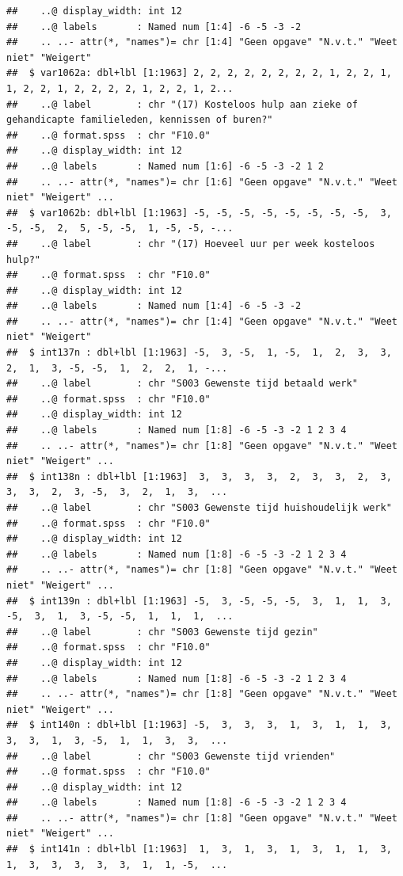 \documentclass[
]{book}
\begin{document}
\begin{verbatim}
##    ..@ display_width: int 12
##    ..@ labels       : Named num [1:4] -6 -5 -3 -2
##    .. ..- attr(*, "names")= chr [1:4] "Geen opgave" "N.v.t." "Weet niet" "Weigert"
##  $ var1062a: dbl+lbl [1:1963] 2, 2, 2, 2, 2, 2, 2, 2, 1, 2, 2, 1, 1, 2, 2, 1, 2, 2, 2, 2, 1, 2, 2, 1, 2...
##    ..@ label        : chr "(17) Kosteloos hulp aan zieke of gehandicapte familieleden, kennissen of buren?"
##    ..@ format.spss  : chr "F10.0"
##    ..@ display_width: int 12
##    ..@ labels       : Named num [1:6] -6 -5 -3 -2 1 2
##    .. ..- attr(*, "names")= chr [1:6] "Geen opgave" "N.v.t." "Weet niet" "Weigert" ...
##  $ var1062b: dbl+lbl [1:1963] -5, -5, -5, -5, -5, -5, -5, -5,  3, -5, -5,  2,  5, -5, -5,  1, -5, -5, -...
##    ..@ label        : chr "(17) Hoeveel uur per week kosteloos hulp?"
##    ..@ format.spss  : chr "F10.0"
##    ..@ display_width: int 12
##    ..@ labels       : Named num [1:4] -6 -5 -3 -2
##    .. ..- attr(*, "names")= chr [1:4] "Geen opgave" "N.v.t." "Weet niet" "Weigert"
##  $ int137n : dbl+lbl [1:1963] -5,  3, -5,  1, -5,  1,  2,  3,  3,  2,  1,  3, -5, -5,  1,  2,  2,  1, -...
##    ..@ label        : chr "S003 Gewenste tijd betaald werk"
##    ..@ format.spss  : chr "F10.0"
##    ..@ display_width: int 12
##    ..@ labels       : Named num [1:8] -6 -5 -3 -2 1 2 3 4
##    .. ..- attr(*, "names")= chr [1:8] "Geen opgave" "N.v.t." "Weet niet" "Weigert" ...
##  $ int138n : dbl+lbl [1:1963]  3,  3,  3,  3,  2,  3,  3,  2,  3,  3,  3,  2,  3, -5,  3,  2,  1,  3,  ...
##    ..@ label        : chr "S003 Gewenste tijd huishoudelijk werk"
##    ..@ format.spss  : chr "F10.0"
##    ..@ display_width: int 12
##    ..@ labels       : Named num [1:8] -6 -5 -3 -2 1 2 3 4
##    .. ..- attr(*, "names")= chr [1:8] "Geen opgave" "N.v.t." "Weet niet" "Weigert" ...
##  $ int139n : dbl+lbl [1:1963] -5,  3, -5, -5, -5,  3,  1,  1,  3, -5,  3,  1,  3, -5, -5,  1,  1,  1,  ...
##    ..@ label        : chr "S003 Gewenste tijd gezin"
##    ..@ format.spss  : chr "F10.0"
##    ..@ display_width: int 12
##    ..@ labels       : Named num [1:8] -6 -5 -3 -2 1 2 3 4
##    .. ..- attr(*, "names")= chr [1:8] "Geen opgave" "N.v.t." "Weet niet" "Weigert" ...
##  $ int140n : dbl+lbl [1:1963] -5,  3,  3,  3,  1,  3,  1,  1,  3,  3,  3,  1,  3, -5,  1,  1,  3,  3,  ...
##    ..@ label        : chr "S003 Gewenste tijd vrienden"
##    ..@ format.spss  : chr "F10.0"
##    ..@ display_width: int 12
##    ..@ labels       : Named num [1:8] -6 -5 -3 -2 1 2 3 4
##    .. ..- attr(*, "names")= chr [1:8] "Geen opgave" "N.v.t." "Weet niet" "Weigert" ...
##  $ int141n : dbl+lbl [1:1963]  1,  3,  1,  3,  1,  3,  1,  1,  3,  1,  3,  3,  3,  3,  3,  1,  1, -5,  ...

\end{verbatim}
\end{document}
